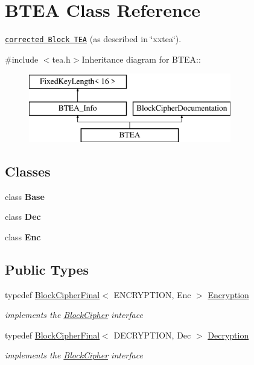\hypertarget{class_b_t_e_a}{
\section{BTEA Class Reference}
\label{class_b_t_e_a}
}


\href{http://www.weidai.com/scan-mirror/cs.html#TEA}{\tt corrected Block TEA} (as described in \char`\"{}xxtea\char`\"{}).  


{\ttfamily \#include $<$tea.h$>$}Inheritance diagram for BTEA::\begin{figure}[H]
\begin{center}
\leavevmode
\includegraphics[height=3cm]{class_b_t_e_a}
\end{center}
\end{figure}
\subsection*{Classes}
\begin{DoxyCompactItemize}
\item 
class {\bfseries Base}
\item 
class {\bfseries Dec}
\item 
class {\bfseries Enc}
\end{DoxyCompactItemize}
\subsection*{Public Types}
\begin{DoxyCompactItemize}
\item 
\hypertarget{class_b_t_e_a_a1110b1f603ad618ba7931d2656af4317}{
typedef \hyperlink{class_block_cipher_final}{BlockCipherFinal}$<$ ENCRYPTION, Enc $>$ \hyperlink{class_b_t_e_a_a1110b1f603ad618ba7931d2656af4317}{Encryption}}
\label{class_b_t_e_a_a1110b1f603ad618ba7931d2656af4317}

\begin{DoxyCompactList}\small\item\em implements the \hyperlink{class_block_cipher}{BlockCipher} interface \item\end{DoxyCompactList}\item 
\hypertarget{class_b_t_e_a_a8741013d5a1702df8c247586bd42a261}{
typedef \hyperlink{class_block_cipher_final}{BlockCipherFinal}$<$ DECRYPTION, Dec $>$ \hyperlink{class_b_t_e_a_a8741013d5a1702df8c247586bd42a261}{Decryption}}
\label{class_b_t_e_a_a8741013d5a1702df8c247586bd42a261}

\begin{DoxyCompactList}\small\item\em implements the \hyperlink{class_block_cipher}{BlockCipher} interface \item\end{DoxyCompactList}\end{DoxyCompactItemize}


